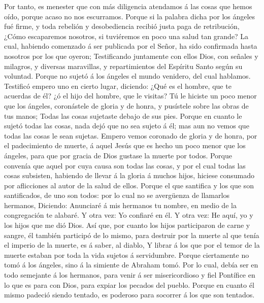  Por tanto, es menester que con más diligencia atendamos á
las cosas que hemos oído, porque acaso no nos escurramos. 
Porque si la palabra dicha por los ángeles fué firme, y toda rebelión y
desobediencia recibió justa paga de retribución,  ¿Cómo
escaparemos nosotros, si tuviéremos en poco una salud tan grande? La
cual, habiendo comenzado á ser publicada por el Señor, ha sido
confirmada hasta nosotros por los que oyeron;  Testificando
juntamente con ellos Dios, con señales y milagros, y diversas
maravillas, y repartimientos del Espíritu Santo según su voluntad.
 Porque no sujetó á los ángeles el mundo venidero, del cual
hablamos.  Testificó empero uno en cierto lugar, diciendo:
¿Qué es el hombre, que te acuerdas de él? ¿ó el hijo del hombre, que le
visitas?  Tú le hiciste un poco menor que los ángeles,
coronástele de gloria y de honra, y pusístele sobre las obras de tus
manos;  Todas las cosas sujetaste debajo de sus pies. Porque
en cuanto le sujetó todas las cosas, nada dejó que no sea sujeto á él;
mas aun no vemos que todas las cosas le sean sujetas. 
Empero vemos coronado de gloria y de honra, por el padecimiento de
muerte, á aquel Jesús que es hecho un poco menor que los ángeles, para
que por gracia de Dios gustase la muerte por todos.  Porque
convenía que aquel por cuya causa son todas las cosas, y por el cual
todas las cosas subsisten, habiendo de llevar á la gloria á muchos
hijos, hiciese consumado por aflicciones al autor de la salud de ellos.
 Porque el que santifica y los que son santificados, de uno
son todos: por lo cual no se avergüenza de llamarlos hermanos,
 Diciendo: Anunciaré á mis hermanos tu nombre, en medio de
la congregación te alabaré.  Y otra vez: Yo confiaré en él.
Y otra vez: He aquí, yo y los hijos que me dió Dios.  Así
que, por cuanto los hijos participaron de carne y sangre, él también
participó de lo mismo, para destruir por la muerte al que tenía el
imperio de la muerte, es á saber, al diablo,  Y librar á
los que por el temor de la muerte estaban por toda la vida sujetos á
servidumbre.  Porque ciertamente no tomó á los ángeles,
sino á la simiente de Abraham tomó.  Por lo cual, debía ser
en todo semejante á los hermanos, para venir á ser misericordioso y fiel
Pontífice en lo que es para con Dios, para expiar los pecados del
pueblo.  Porque en cuanto él mismo padeció siendo tentado,
es poderoso para socorrer á los que son tentados.

